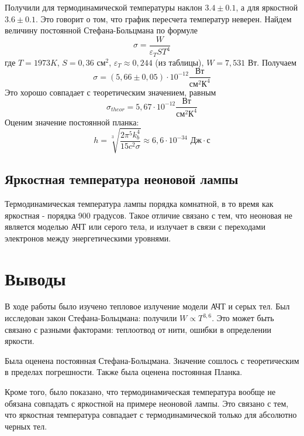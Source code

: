 \documentclass[a4paper, 12pt]{article}
\begin{document}
Получили для термодинамической температуры наклон $3.4 \pm 0.1$, а для яркостной $3.6 \pm 0.1$. Это говорит о том, что график пересчета температур неверен.
Найдем величину постоянной Стефана-Больцмана по формуле
\begin{equation}
	\sigma = \frac{W}{\varepsilon_T S T^4}
\end{equation}
где $T = 1973 K$, $S = 0,36 \text{ см}^2$, $\varepsilon_T \approx 0,244$ (из таблицы), $W = 7,531 \text{ Вт}$. Получаем 
\begin{equation*}
	\sigma = (5,66 \pm 0,05)\cdot 10^{-12} \frac{\text{Вт}}{\text{см}^2\text{К}^4}
\end{equation*}
Это хорошо совпадает с теоретическим значением, равным
\begin{equation*}
	\sigma_{theor} = 5,67\cdot 10^{-12}\frac{\text{Вт}}{\text{см}^2\text{К}^4}
\end{equation*}
Оценим значение постоянной планка:
\begin{equation*}
	h = \sqrt[3]{\frac{2 \pi ^5 k_b^4}{15 c^2 \sigma}} \approx 6,6\cdot 10^{-34} \text{ Дж}\cdot \text{с}
\end{equation*}
\subsection*{Яркостная температура неоновой лампы}
Термодинамическая температура лампы порядка комнатной, в то время как яркостная - порядка 900 градусов. Такое отличие связано с тем, что неоновая не является моделью АЧТ или серого тела, и излучает в связи с переходами электронов между энергетическими уровнями.

\section{Выводы}
В ходе работы было изучено тепловое излучение модели АЧТ и серых тел. Был исследован закон Стефана-Больцмана: получили $W \propto T^{3,6}$. Это может быть связано с разными факторами: теплоотвод от нити, ошибки в определении яркости. 

Была оценена постоянная Стефана-Больцмана. Значение сошлось с теоретическим в пределах погрешности. Также была оценена постоянная Планка.

Кроме того, было показано, что термодинамическая температура вообще не обязана совпадать с яркостной на примере неоновой лампы. Это связано с тем, что яркостная температура совпадает с термодинамической только для абсолютно черных тел.
\end{document}

